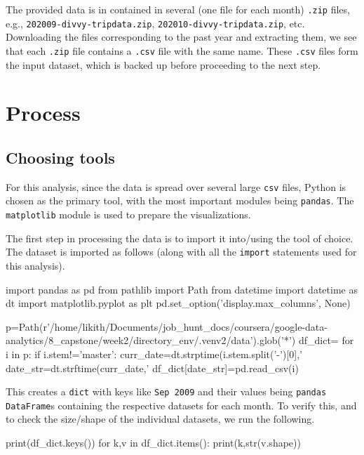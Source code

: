 \documentclass{article}
\begin{document}
The provided data is in contained in several (one file for each month) \texttt{.zip} files, e.g., \texttt{202009-divvy-tripdata.zip}, \texttt{202010-divvy-tripdata.zip}, etc. Downloading the files corresponding to the past year and extracting them, we see that each \texttt{.zip} file contains a \texttt{.csv} file with the same name. These \texttt{.csv} files form the input dataset, which is backed up before proceeding to the next step.

\section{Process}


\subsection*{Choosing tools}

For this analysis, since the data is spread over several large \texttt{csv} files, Python is chosen as the primary tool, with the most important modules being \texttt{pandas}. The \texttt{matplotlib} module is used to prepare the visualizations.


The first step in processing the data is to import it into/using the tool of choice. The dataset is imported as follows (along with all the \texttt{import} statements used for this analysis).

\begin{pythoncode}
import pandas as pd
from pathlib import Path
from datetime import datetime as dt
import matplotlib.pyplot as plt
pd.set_option('display.max_columns', None)

p=Path(r'/home/likith/Documents/job_hunt_docs/coursera/google-data-analytics/8_capstone/week2/directory_env/.venv2/data').glob('*')
df_dict={}
for i in p:
    if i.stem!='master':
        curr_date=dt.strptime(i.stem.split('-')[0],'%
        date_str=dt.strftime(curr_date,'%
        df_dict[date_str]=pd.read_csv(i)
\end{pythoncode}

This creates a \texttt{dict} with keys like \texttt{Sep 2009} and their values being \texttt{pandas DataFrame}s containing the respective datasets for each month. To verify this, and to check the size/shape of the individual datasets, we run the following.

\begin{pythoncode}
print(df_dict.keys())
for k,v in df_dict.items():
    print(k,str(v.shape))
\end{pythoncode}
\end{document}
